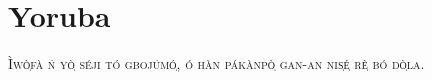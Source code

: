 

\presection\section*{\checkno Yoruba}\postsection

\textsc{Ìwò̩fà ń yò̩ séji tó gbojúmó̩, ó hàn pákànpò̩ gan-an nis̩é̩ rè̩ bó dò̩la.}
